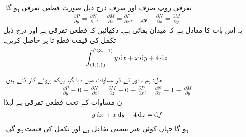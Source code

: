 \\
تفرقی روپ  صرف اور صرف درج ذیل صورت قطعی تفرقی ہو گا۔
\begin{align}\label{مساوات_سمتی_تکمل_پرکھ_قطعی_تفرقی}
\frac{\partial P}{\partial y}=\frac{\partial N}{\partial z},\quad \frac{\partial M}{\partial z}=\frac{\partial P}{\partial x}, \quad \text{اور}\quad \frac{\partial N}{\partial x}=\frac{\partial M}{\partial y}
\end{align}
یہ اس بات کا معادل ہے کہ میدان  بقائی ہے۔
دکھائیں کہ  قطعی تفرقی ہے اور درج ذیل تکمل کی قیمت قطع  تا  پر حاصل کریں۔
\begin{align*}
\int_{(1,1,1)}^{(2,3,-1)} y\dif x+x\dif y+4\dif z
\end{align*}

حل:\quad
ہم ،  اور  لے کر مساوات  میں دیا گیا پرکھ بروئے کار لاتے ہیں۔
\begin{align*}
\frac{\partial P}{\partial y}=0=\frac{\partial N}{\partial z},\quad \frac{\partial M}{\partial z}=0=\frac{\partial P}{\partial x},\quad \frac{\partial N}{\partial x}=1=\frac{\partial M}{\partial y}
\end{align*}
ان مساوات کے تحت  قطعی تفرقی ہے لہٰذا 
\begin{align*}
 y\dif x+x\dif y+4\dif z=\dif f
\end{align*}
ہو گا جہاں  کوئی غیر سمتی تفاعل ہے اور تکمل کی  قیمت  ہو گی۔

